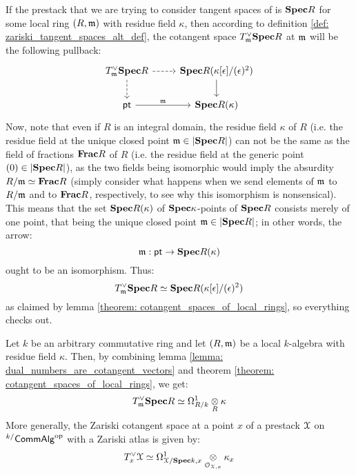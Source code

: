             \begin{remark}
                If the prestack that we are trying to consider tangent spaces of is $\mathbf{Spec} R$ for some local ring $(R, \mathfrak{m})$ with residue field $\kappa$, then according to definition \ref{def: zariski_tangent_spaces_alt_def}, the cotangent space $T^{\vee}_{\mathfrak{m}}\mathbf{Spec} R$ at $\mathfrak{m}$ will be the following pullback:
                    $$
                        \begin{tikzcd}
                        	{T^{\vee}_{\m}\Spec R} & {\Spec R(\kappa[\e]/(\e)^2)} \\
                        	\pt & {\Spec R(\kappa)}
                        	\arrow[from=1-2, to=2-2]
                        	\arrow["\m", from=2-1, to=2-2]
                        	\arrow[dashed, from=1-1, to=2-1]
                        	\arrow[dashed, from=1-1, to=1-2]
                        \end{tikzcd}
                    $$
                Now, note that even if $R$ is an integral domain, the residue field $\kappa$ of $R$ (i.e. the residue field at the unique closed point $\mathfrak{m} \in |\mathbf{Spec} R|$) can not be the same as the field of fractions $\mathbf{Frac} R$ of $R$ (i.e. the residue field at the generic point $(0) \in |\mathbf{Spec} R|$), as the two fields being isomorphic would imply the absurdity $R/\mathfrak{m} \simeq \mathbf{Frac} R$ (simply consider what happens when we send elements of $\mathfrak{m}$ to $R/\mathfrak{m}$ and to $\mathbf{Frac} R$, respectively, to see why this isomorphism is nonsensical). This means that the set $\mathbf{Spec} R(\kappa)$ of $\mathbf{Spec} \kappa$-points of $\mathbf{Spec} R$ consists merely of one point, that being the unique closed point $\mathfrak{m} \in |\mathbf{Spec} R|$; in other words, the arrow:
                    $$\mathfrak{m}: \mathsf{pt} \to \mathbf{Spec} R(\kappa)$$
                ought to be an isomorphism. Thus:
                    $$T^{\vee}_{\mathfrak{m}}\mathbf{Spec} R \simeq \mathbf{Spec} R(\kappa[\epsilon]/(\epsilon)^2)$$
                as claimed by lemma \ref{theorem: cotangent_spaces_of_local_rings}, so everything checks out.
            \end{remark}
            \begin{remark} 
                Let $k$ be an arbitrary commutative ring and let $(R, \mathfrak{m})$ be a local $k$-algebra with residue field $\kappa$. Then, by combining lemma \ref{lemma: dual_numbers_are_cotangent_vectors} and theorem \ref{theorem: cotangent_spaces_of_local_rings}, we get:
                    $$T^{\vee}_{\m}\Spec R \cong \Omega^1_{R/k} \tensor_R \kappa$$
                More generally, the Zariski cotangent space at a point $x$ of a prestack $\mathcal{X}$ on ${}^{k/}\mathsf{Comm}\mathsf{Alg}^{\mathrm{op}}$ with a Zariski atlas is given by:
                    $$T^{\vee}_x\calX \cong \Omega^1_{\calX/\Spec k, x} \tensor_{\calO_{\calX, x}} \kappa_x$$
            \end{remark}
            
